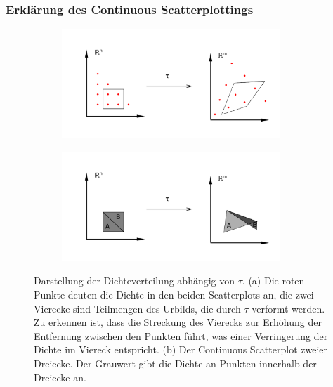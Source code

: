\documentclass[a4paper,fontsize=12pt,toc=bib,halfparskip]{scrartcl}
\begin{document}
\subsubsection{Erkl\"arung des Continuous Scatterplottings}
\begin{figure}
	\centering
	\begin{subfigure}{0.45\textwidth}
		\includegraphics[width=0.9\textwidth]{pictures/ContinuousScatterplot}
		\subcaption{}
	\end{subfigure}
	\begin{subfigure}{0.45\textwidth}
		\includegraphics[width=0.9\textwidth]{pictures/Case2}
		\subcaption{}
		\label{Case2}
	\end{subfigure}
	\caption{Darstellung der Dichteverteilung abh\"angig von $\tau$. (a) Die roten Punkte deuten die Dichte in den beiden Scatterplots an, die zwei Vierecke sind Teilmengen des Urbilds, die durch $\tau$ verformt werden. Zu erkennen ist, dass die Streckung des Vierecks zur Erh\"ohung der Entfernung zwischen den Punkten f\"uhrt, was einer Verringerung der Dichte im Viereck entspricht. (b) Der Continuous Scatterplot zweier Dreiecke. Der Grauwert gibt die Dichte an Punkten innerhalb der Dreiecke an.}
	\label{ContinuousScatterplot}
\end{figure}
\end{document}
